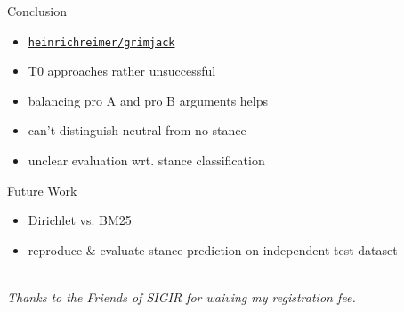 \documentclass[english]{mlutalk}
\begin{document}
\begin{frame}{Conclusion}
  \begin{itemize}
    \setlength{\itemsep}{2ex}
    \item[\faIcon{github}] \href{https://github.com/heinrichreimer/grimjack}{\texttt{heinrichreimer/grimjack}}
    \item T0 approaches rather unsuccessful
    \item balancing pro A and pro B arguments helps
    \item can't distinguish neutral from no stance
    \item unclear evaluation wrt. stance classification
  \end{itemize}
  \vspace{2ex}
  \begin{block}{Future Work}
    \begin{itemize}
      \setlength{\itemsep}{2ex}
      \item Dirichlet vs. BM25
      \item reproduce \& evaluate stance prediction on independent test dataset
    \end{itemize}
  \end{block}
  \begin{flushright}
    \thankyou \\
    {\itshape\scriptsize Thanks to the Friends of SIGIR for waiving my registration fee.}
  \end{flushright}
\end{frame}

\appendix
\section{\appendixname}

\bibliographyframe
\end{document}
